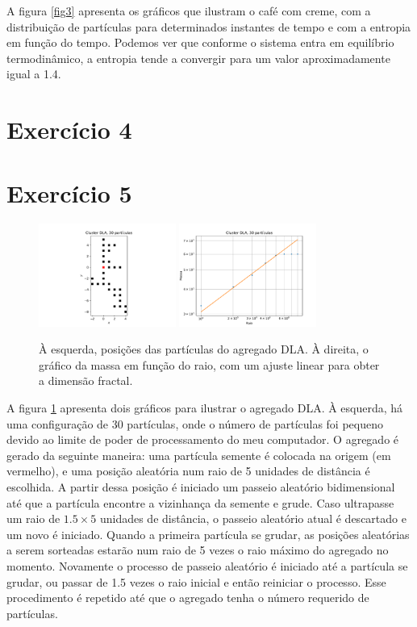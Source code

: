 \documentclass[a4paper, brazil]{article}
\begin{document}
A figura \ref{fig3} apresenta os gráficos que ilustram o café com creme, com a distribuição de partículas para determinados instantes de tempo e com a entropia em função do tempo.
Podemos ver que conforme o sistema entra em equilíbrio termodinâmico, a entropia tende a convergir para um valor aproximadamente igual a \num{1.4}.

\newpage
\section{Exercício 4}



\newpage
\section{Exercício 5}

\begin{figure}[ht]
\centering
\includegraphics[width=0.4\textwidth]{fig_5a.pdf}
\includegraphics[width=0.4\textwidth]{fig_5b.pdf}
\caption{À esquerda, posições das partículas do agregado DLA. À direita, o gráfico da massa em função do raio, com um ajuste linear para obter a dimensão fractal.}\label{fig5}
\end{figure}

A figura \ref{fig5} apresenta dois gráficos para ilustrar o agregado DLA.
À esquerda, há uma configuração de 30 partículas, onde o número de partículas foi pequeno devido ao limite de poder de processamento do meu computador.
O agregado é gerado da seguinte maneira: uma partícula semente é colocada na origem (em vermelho), e uma posição aleatória num raio de 5 unidades de distância é escolhida.
A partir dessa posição é iniciado um passeio aleatório bidimensional até que a partícula encontre a vizinhança da semente e grude. Caso ultrapasse um raio de \( \num{1.5} \times 5 \) unidades de distância, o passeio aleatório atual é descartado e um novo é iniciado.
Quando a primeira partícula se grudar, as posições aleatórias a serem sorteadas estarão num raio de 5 vezes o raio máximo do agregado no momento.
Novamente o processo de passeio aleatório é iniciado até a partícula se grudar, ou passar de \num{1.5} vezes o raio inicial e então reiniciar o processo.
Esse procedimento é repetido até que o agregado tenha o número requerido de partículas.
\end{document}
